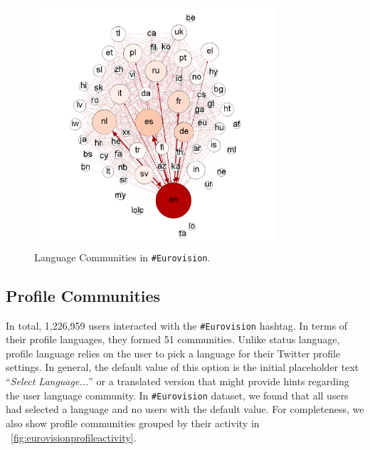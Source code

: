 \documentclass{llncs}
\begin{document}
\begin{figure}[htb]
\centering
\includegraphics[width=0.8\textwidth]{images/p_s_nselfloop.png}
\caption{Language Communities in {\texttt{\#Eurovision}}.}
\label{fig:eurovisionlangcommunities}
\end{figure}

\subsection{Profile Communities}\label{ppcomm}

In total, 1,226,959 users interacted with the {\texttt{\#Eurovision}}
hashtag. In terms of their profile languages, they formed 51
communities. Unlike status language, profile language relies on the user to pick a
language for their Twitter profile settings. In general, the default
value of this option is the initial placeholder text ``{\emph{Select
Language...}}'' or a translated version that might provide hints
regarding the user language community. In {\texttt{\#Eurovision}}
dataset, we found that all users had selected a language and no users
with the default value.  For completeness, we also show profile
communities grouped by their activity in
~\ref{fig:eurovisionprofileactivity}.

\end{document}

